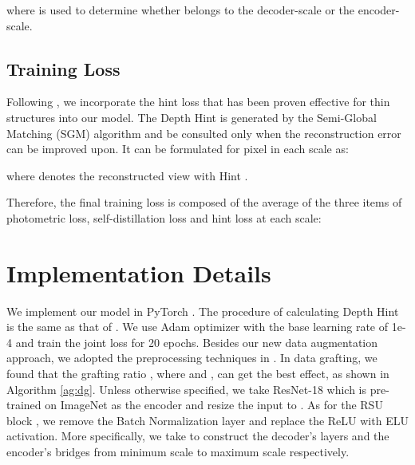 \documentclass[10pt,twocolumn,letterpaper]{article}
\begin{document}
where  is used to determine whether  belongs to the 
decoder-scale or the encoder-scale.

\subsection{Training Loss} \label{sec:tl}

Following \cite{Watson2019}, we incorporate the hint loss that has been proven 
effective for thin structures into our model. The Depth Hint  is generated by the 
Semi-Global Matching (SGM) algorithm \cite{Hirschmuller2005,Hirschmuller2008} and be 
consulted only when the reconstruction error can be improved upon. It can be formulated 
for pixel  in each scale as:

where  denotes the reconstructed view with Hint .

Therefore, the final training loss is composed of the average of the three items 
of photometric loss, self-distillation loss and hint loss at each scale:




\section{Implementation Details}

We implement our model in PyTorch \cite{paszke2017automatic}. The procedure of calculating 
Depth Hint is the same as that of \cite{Watson2019}. We use Adam \cite{Kingma2015} 
optimizer with the base learning rate of 1e-4 and train the joint loss for 20 epochs. 
Besides our new data 
augmentation approach, we adopted the preprocessing techniques in \cite{Godard2019}. In 
data grafting, we found that the grafting ratio , where  
and , can get the best effect, as shown in Algorithm \ref{ag:dg}. 
Unless otherwise specified, we take ResNet-18 which is pre-trained on ImageNet 
\cite{JiaDeng2009} as the encoder and resize the input to . As for the 
RSU block \cite{Qin2020}, we remove the Batch Normalization layer 
\cite{Ioffe2015} and replace the ReLU \cite{Nair2010} with ELU \cite{Clevert2016} activation. 
More specifically, we take  to construct the decoder's 
layers and the encoder's bridges from minimum scale to maximum scale respectively.
\end{document}
